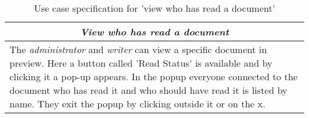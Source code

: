 \begin{table}
\centering
\begin{tabular}{p{12cm}}
\hline
\multicolumn{1}{c}{\textit{\textbf{View who has read a document}}} \\
\hline
The \textit{administrator} and \textit{writer} can view a specific document in preview.
Here a button called 'Read Status' is available and by clicking it a pop-up appears.
In the popup everyone connected to the document who has read it and who should have read it is listed by name.
They exit the popup by clicking outside it or on the x.
\\\hline
\end{tabular}
\caption{Use case specification for 'view who has read a document'}\label{tab:read-status}
\end{table}